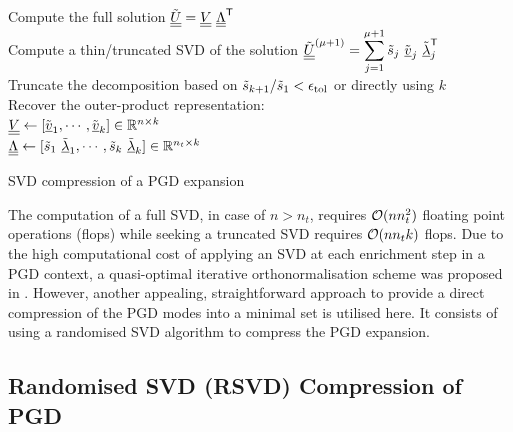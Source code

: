 \begin{algorithm}[hbt!]
	\vspace{0.2cm}
	\vspace{0.2cm}

	Compute the full solution $\tilde{\underline{\underline{U}}} = \underline{\underline{V}} \ {\underline{\underline{\Lambda}}}^{\sf T}$\\
	Compute a thin/truncated SVD of the solution $\tilde{\underline{\underline{U}}}^{(\mu+1)} = \displaystyle\sum_{j=1}^{\mu+1} {\tilde{s}}_j \ {\tilde{\underline{v}}}_j \ {{\tilde{\underline{\lambda}}}}^{\sf T}_j$\\
	Truncate the decomposition based on ${\tilde{s}}_{k+1}/{\tilde{s}}_1< \epsilon_{\mathrm{tol}}$ or directly using $k$\\
	Recover the outer-product representation:\\
	\qquad $\underline{\underline{V}} \leftarrow [{\tilde{\underline{v}}}_1,\cdots,{\tilde{\underline{v}}}_{k}] \in {\mathbb{ R}}^{n\times k} $\\[0.1cm]
	\qquad $\mLambda \leftarrow [\z{s}_1\ \z\vlambda_1,\cdots,\z{s}_k\ \z\vlambda_{k}] \in \ffR^{n_t \times k} $

	\caption{SVD compression of a PGD expansion}
	\label{alg:svd}
\end{algorithm}

The computation of a full SVD, in case of $n>n_t$, requires ${\cal O}(nn_t^2)$ floating point operations (flops) while seeking a truncated SVD requires ${\cal O}(nn_t k)$ flops. Due to the high computational cost of applying an SVD at each enrichment step in a PGD context, a quasi-optimal iterative orthonormalisation scheme was proposed in \parencite{Giacoma2015,Giacoma2016}. However, another appealing, straightforward approach to provide a direct compression of the PGD modes into a minimal set is utilised here. It consists of using a randomised SVD algorithm \parencite{halko2011finding} to compress the PGD expansion.

\subsection{Randomised SVD (RSVD) Compression of PGD}

